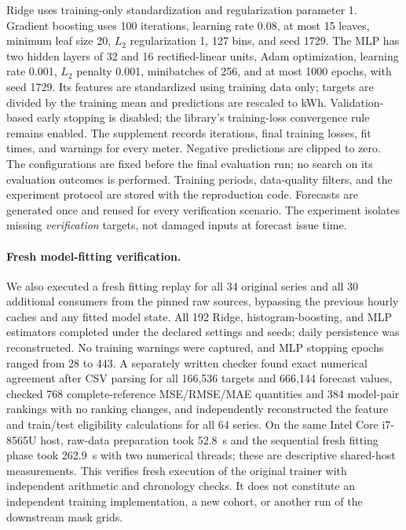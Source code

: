\documentclass[12pt]{article}
\begin{document}
Ridge uses training-only standardization and regularization parameter 1.
Gradient boosting uses 100 iterations, learning rate 0.08, at most 15
leaves, minimum leaf size 20, $L_2$ regularization 1, 127 bins, and seed
1729. The MLP has two hidden layers of 32 and 16 rectified-linear units,
Adam optimization, learning rate 0.001, $L_2$ penalty 0.001, minibatches
of 256, and at most 1000 epochs, with seed 1729. Its features are standardized
using training data only; targets are divided by the training mean and
predictions are rescaled to kWh. Validation-based early stopping is disabled;
the library's training-loss convergence rule remains enabled. The supplement
records iterations, final training losses, fit times, and warnings for every
meter. Negative predictions are clipped to zero. The configurations are
fixed before the final evaluation run; no search on its evaluation outcomes is
performed. Training periods,
data-quality filters, and the experiment protocol are stored with the
reproduction code. Forecasts are generated once and reused for every
verification scenario. The experiment isolates missing \emph{verification}
targets, not damaged inputs at forecast issue time.

\paragraph{Fresh model-fitting verification.}
We also executed a fresh fitting replay for all 34 original series and all 30 additional consumers from the pinned raw sources, bypassing the previous hourly caches and any fitted model state. All 192 Ridge, histogram-boosting, and MLP estimators completed under the declared settings and seeds; daily persistence was reconstructed. No training warnings were captured, and MLP stopping epochs ranged from 28 to 443. A separately written checker found exact numerical agreement after CSV parsing for all 166,536 targets and 666,144 forecast values, checked 768 complete-reference MSE/RMSE/MAE quantities and 384 model-pair rankings with no ranking changes, and independently reconstructed the feature and train/test eligibility calculations for all 64 series. On the same Intel Core i7-8565U host, raw-data preparation took 52.8~s and the sequential fresh fitting phase took 262.9~s with two numerical threads; these are descriptive shared-host measurements. This verifies fresh execution of the original trainer with independent arithmetic and chronology checks. It does not constitute an independent training implementation, a new cohort, or another run of the downstream mask grids.
\end{document}
